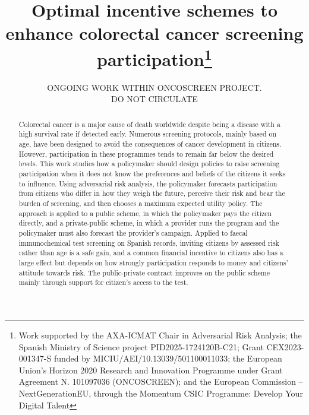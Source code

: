\documentclass[12pt]{article}
\begin{document}
\title{Optimal incentive schemes to enhance colorectal cancer screening participation\thanks{Work supported by the AXA-ICMAT Chair in Adversarial Risk Analysis; the Spanish Ministry of Science project PID2025-1724120B-C21; Grant CEX2023-001347-S funded by MICIU/AEI/10.13039/501100011033; the European Union's Horizon 2020 Research and Innovation Programme under Grant Agreement N. 101097036 (ONCOSCREEN); and the European Commission – NextGenerationEU, through the Momentum CSIC Programme: Develop Your Digital Talent}
}


\author{}
\date{ONGOING WORK WITHIN ONCOSCREEN PROJECT.\\ DO NOT CIRCULATE}

\maketitle
\begin{abstract}
Colorectal cancer is a major cause of death worldwide despite being a disease with a high survival rate if detected early. Numerous screening protocols, mainly based on age, have been designed to avoid the consequences of cancer development in citizens. However, participation in these programmes tends to remain far below the desired levels. This work studies how a policymaker should design policies to raise screening participation when it does not know the preferences and beliefs of the citizens it seeks to influence. Using adversarial risk analysis, the policymaker forecasts participation from citizens who differ in how they weigh the future, perceive their risk and bear the burden of screening, and then chooses a maximum expected utility policy. The approach is applied to a public scheme, in which the policymaker pays the citizen directly, and a private-public scheme, in which a provider runs the program and the policymaker must also forecast the provider's campaign. Applied to faecal immunochemical test screening on Spanish records, inviting citizens by assessed risk rather than age is a safe gain, and a common financial incentive to citizens also has a large effect but depends on how strongly participation responds to money and citizens' attitude towards risk. The public-private contract improves on the public scheme mainly through support for citizen's access to the test.
\end{abstract}
\end{document}
